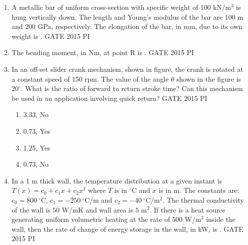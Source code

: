 \documentclass[journal,12pt,onecolumn]{IEEEtran}
\theoremstyle{remark}
\begin{document}
\begin{enumerate}
\item A metallic bar of uniform cross-section with specific weight of $100$ kN/m$^3$ is hung vertically down. The length and Young's modulus of the bar are $100$ m and $200$ GPa, respectively. The elongation of the bar, in mm, due to its own weight is \underline{\hspace{2cm}}. \hfill{GATE 2015 PI}

\item The bending moment, in Nm, at point R is \underline{\hspace{2cm}}. \hfill{GATE 2015 PI}

\item In an off-set slider crank mechanism, shown in figure, the crank is rotated at a constant speed of 150 rpm. The value of the angle $\theta$ shown in the figure is $20^\circ$. What is the ratio of forward to return stroke time? Can this mechanism be used in an application involving quick return? \hfill{GATE 2015 PI}
\begin{enumerate}
    \item 3.33, No
    \item 0.73, Yes
    \item 1.25, Yes
    \item 0.73, No
\end{enumerate}

\item In a 1 m thick wall, the temperature distribution at a given instant is $T(x) = c_0 + c_1 x + c_2 x^2$ where $T$ is in $^\circ$C and $x$ is in m. The constants are: $c_0 = 800~^\circ$C, $c_1 = -250~^\circ$C/m and $c_2 = -40~^\circ$C/m$^2$. The thermal conductivity of the wall is $50$ W/mK and wall area is $5$ m$^2$. If there is a heat source generating uniform volumetric heating at the rate of $500$ W/m$^3$ inside the wall, then the rate of change of energy storage in the wall, in kW, is \underline{\hspace{2cm}}. \hfill{GATE 2015 PI}


\end{enumerate}
\end{document}
